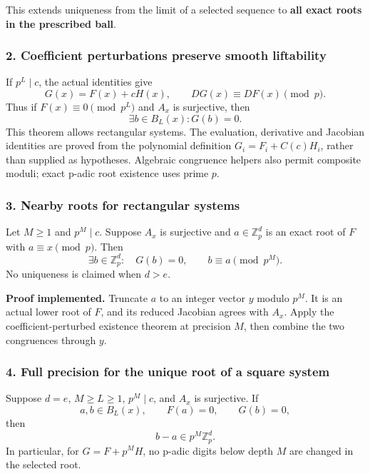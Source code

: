 This extends uniqueness from the limit of a selected sequence to
\textbf{all exact roots in the prescribed ball}.

\hypertarget{cont4:coefficient-perturbations-preserve-smooth-liftability}{%
\subsubsection{2. Coefficient perturbations preserve smooth
liftability}\label{cont4:coefficient-perturbations-preserve-smooth-liftability}}

If \(p^L\mid c\), the actual identities give \[
G(x)=F(x)+cH(x),\qquad DG(x)\equiv DF(x)\pmod p.
\] Thus if \(F(x)\equiv0\pmod{p^L}\) and \(A_x\) is surjective, then \[
\exists b\in B_L(x):G(b)=0.
\] This theorem allows rectangular systems. The evaluation, derivative
and Jacobian identities are proved from the polynomial definition
\(G_i=F_i+C(c)H_i\), rather than supplied as hypotheses. Algebraic
congruence helpers also permit composite moduli; exact p-adic root
existence uses prime \(p\).

\hypertarget{cont4:nearby-roots-for-rectangular-systems}{%
\subsubsection{3. Nearby roots for rectangular
systems}\label{cont4:nearby-roots-for-rectangular-systems}}

Let \(M\ge1\) and \(p^M\mid c\). Suppose \(A_x\) is surjective and
\(a\in\mathbb Z_p^d\) is an exact root of \(F\) with
\(a\equiv x\pmod p\). Then \[
\boxed{\exists b\in\mathbb Z_p^d:\quad G(b)=0,
\qquad b\equiv a\pmod{p^M}.}
\] No uniqueness is claimed when \(d>e\).

\textbf{Proof implemented.} Truncate \(a\) to an integer vector \(y\)
modulo \(p^M\). It is an actual lower root of \(F\), and its reduced
Jacobian agrees with \(A_x\). Apply the coefficient-perturbed existence
theorem at precision \(M\), then combine the two congruences through
\(y\).

\hypertarget{cont4:full-precision-for-the-unique-square-root}{%
\subsubsection{4. Full precision for the unique root of a square
system}\label{cont4:full-precision-for-the-unique-square-root}}

Suppose \(d=e\), \(M\ge L\ge1\), \(p^M\mid c\), and \(A_x\) is
surjective. If \[
a,b\in B_L(x),\qquad F(a)=0,\qquad G(b)=0,
\] then \[
\boxed{b-a\in p^M\mathbb Z_p^d.}
\] In particular, for \(G=F+p^MH\), no p-adic digits below depth \(M\)
are changed in the selected root.


